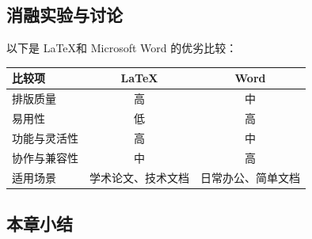 
\subsection{消融实验与讨论}

以下是 \LaTeX 和 Microsoft Word 的优劣比较：

\begin{table}[h] %
  \centering
  \label{tab:latex-vs-word} %
  \begin{tabular}{lcc} %
    \toprule %
    \textbf{比较项} & \textbf{\LaTeX} & \textbf{Word} \\
    \midrule %
    排版质量 & 高 & 中 \\
    易用性 & 低 & 高 \\
    功能与灵活性 & 高 & 中 \\
    协作与兼容性 & 中 & 高 \\
    适用场景 & 学术论文、技术文档 & 日常办公、简单文档 \\
    \bottomrule %
    
  \end{tabular}
\end{table}


\subsection{本章小结}